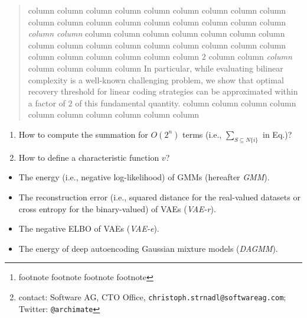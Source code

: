\documentclass{IEEEtran}
\author{
	Philip Hauer\thanks{  footnote  footnote  footnote  footnote },~Karl Flöthner,~Dimitri Schaab,~Jonathan Ottnad,~Viktor Ratza,~Markus Ball,~Bernhard Ketzer\\
	Helmholtz-Institut für Strahlen- und Kernphysik\\
	Universität Bonn\\
	53115 Bonn - Germany
}
\author{Christoph F. Strnadl\footnote{contact: Software AG, CTO Office, \texttt{christoph.strnadl@softwareag.com}; Twitter: \texttt{@archimate}}\;, IEEE \emph{Senior Member}}
\begin{document}
\begin{abstract}
  column \currentcolumn{}  column \currentcolumn{}  column \currentcolumn{}  column \currentcolumn{}  column \currentcolumn{}  column \currentcolumn{}  column \currentcolumn{}  column \currentcolumn{}  column \currentcolumn{}  column \currentcolumn{}  column \currentcolumn{}  column \currentcolumn{}  column \currentcolumn{}  column \currentcolumn{}  column \currentcolumn{}  column \currentcolumn{}  column \currentcolumn{}  column \currentcolumn{} \emph{  column \currentcolumn{}  column \currentcolumn{} }  column \currentcolumn{}  column \currentcolumn{}  column \currentcolumn{}  column \currentcolumn{}  column \currentcolumn{}  column \currentcolumn{}  column \currentcolumn{}  column \currentcolumn{}  column \currentcolumn{}  column \currentcolumn{}  column \currentcolumn{}  column \currentcolumn{}  column \currentcolumn{}  column \currentcolumn{}  column \currentcolumn{}  column \currentcolumn{}  column \currentcolumn{}  column \currentcolumn{}  column \currentcolumn{}  column \currentcolumn{}  column \currentcolumn{}  column \currentcolumn{} $2$  column \currentcolumn{}  column \currentcolumn{} \emph{  column \currentcolumn{} }  column \currentcolumn{}  column \currentcolumn{}  column \currentcolumn{}  column \currentcolumn{} {In particular, while evaluating bilinear complexity is a well-known challenging problem, we show that optimal recovery threshold for linear coding strategies can be approximated within a factor of $2$ of this fundamental quantity.}
  column \currentcolumn{}  column \currentcolumn{}  column \currentcolumn{}  column \currentcolumn{}  column \currentcolumn{}  column \currentcolumn{}  column \currentcolumn{}  column \currentcolumn{}  column \currentcolumn{}  column \currentcolumn{}
\end{abstract}


       \begin{enumerate}
    \item How to compute the summation for $O(2^n)$ terms (i.e., $\sum_{S \subseteq N \{i\}}$ in Eq.)?
    \item How to define a characteristic function $v$?
\end{enumerate}

       \begin{itemize}[leftmargin=3ex,topsep=0.5ex,itemsep=0.32ex]
    \item The energy (i.e., negative log-likelihood) of GMMs (hereafter \textsl{GMM}).
    \item The reconstruction error (i.e., squared distance for the real-valued datasets or cross entropy for the binary-valued) of VAEs (\textsl{VAE-r}).
    \item The negative ELBO of VAEs (\textsl{VAE-e}).
    \item The energy of deep autoencoding Gaussian mixture models \cite{zong_deep_2018} (\textsl{DAGMM}).
\end{itemize}
\end{document}
